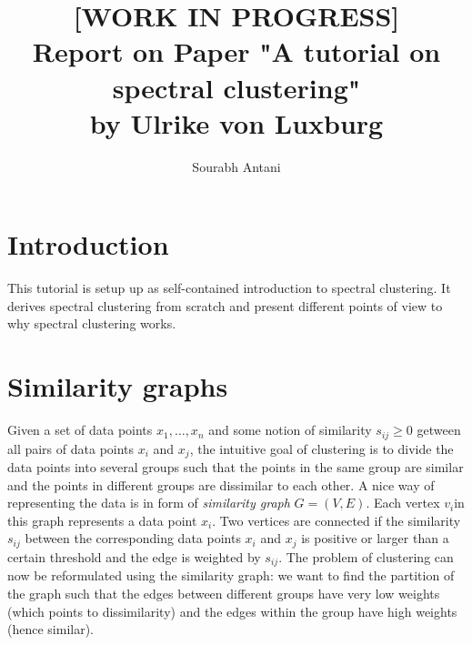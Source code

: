 \documentclass[10pt,a4paper, nocenter]{report}
\author{Sourabh Antani}
\title{[WORK IN PROGRESS] \\ Report on Paper "A tutorial on spectral clustering" \\by Ulrike von Luxburg}
\date{}
\begin{document}
	\maketitle
	\chapter{Introduction}
	\thispagestyle{fancy}
	This tutorial is setup up as self-contained introduction to spectral clustering. It derives spectral clustering from scratch and present different points of view to why spectral clustering works. 
	
	\chapter{Similarity graphs}
	\thispagestyle{fancy}
		Given a set of data points $x_{1},\dots,x_{n}$ and some notion of similarity $s_{ij}\ge 0$ getween all pairs of data points $x_{i}$ and $x_{j}$, the intuitive goal of clustering is to divide the data points into several groups such that the points in the same group are similar and the points in different groups are dissimilar to each other. A nice way of representing the data is in form of \textit{similarity graph} $G=(V,E)$. Each vertex $v_{i}$in this graph represents a data point $x_{i}$. Two vertices are connected if the similarity $s_{ij}$ between the corresponding data points $x_{i}$ and $x_{j}$ is positive or larger than a certain threshold and the edge is weighted by $s_{ij}$. The problem of clustering can now be reformulated using the similarity graph: we want to find the partition of the graph such that the edges between different groups have very low weights (which points to dissimilarity) and the edges within the group have high weights (hence similar). 
		\\
\end{document}
